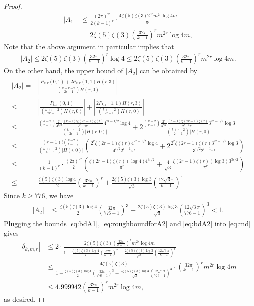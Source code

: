 \documentclass[11pt,letterpaper,reqno]{amsart}
\numberwithin{figure}{section}
\numberwithin{table}{section}
\theoremstyle{definition}
\theoremstyle{plain}
\theoremstyle{definition}
\theoremstyle{definition}
\theoremstyle{remark}
\numberwithin{equation}{section}
\theoremstyle{remark}
\begin{document}
\begin{proof}
\begin{align}
    |A_1|&\leq\frac{(2\pi)^{2r}}{2(k-1)^r}\cdot\frac{4\zeta(5)\zeta(3)2^{3r}m^{2r}\log4m}{\pi^r}\\&=2\zeta(5)\zeta(3)\left(\frac{32\pi}{k-1}\right)^rm^{2r}\log4m,\label{eq:bdA1}
\end{align}
Note that the above argument in particular implies that 
\begin{align}
    |A_{2}|\leq2\zeta(5)\zeta(3)\left(\frac{32\pi}{k-1}\right)^r\log4\leq2\zeta(5)\zeta(3)\left(\frac{32\pi}{k-1}\right)^rm^{2r}\log4m.\label{eq:roughboundforA2}
\end{align}
On the other hand, the upper bound of $|A_2|$ can be obtained by
\begin{align}
    |A_2|=&\left|\frac{P_{k,r}(0,1)+2P_{k,r}(1,1)H(r,3)}{\binom{k+r-2}{2r-1}H(r,0)}\right|\\\leq&\left|\frac{P_{k,r}(0,1)}{\binom{k+r-2}{2r-1}H(r,0)}\right|+\left|\frac{2P_{k,r}(1,1)H(r,3)}{\binom{k+r-2}{2r-1}H(r,0)}\right|\\\leq&\frac{\binom{k-2}{r-1}\frac{2^r}{4^{r/2}}\frac{(r-1)!\zeta(2r-1)\zeta(r)}{2^{r-1}\pi^r}4^{2r-1/2}\log4}{\binom{k+r-2}{2r-1}|H(r,0)|}+2\frac{\binom{k-2}{r-1}\frac{2^r}{3^{r/2}}\frac{(r-1)!\zeta(2r-1)\zeta(r)}{2^{r-1}\pi^r}3^{2r-1/2}\log3}{\binom{k+r-2}{2r-1}|H(r,0)|}\\\leq&\frac{(r-1)!\binom{k-2}{r-1}}{\binom{k+r-2}{2r-1}|H(r,0)|}\left(\frac{2^r\zeta(2r-1)\zeta(r)4^{2r-1/2}\log4}{4^{r/2}2^{r-1}\pi^r}+2\frac{2^r\zeta(2r-1)\zeta(r)3^{2r-1/2}\log3}{3^{r/2}2^{r-1}\pi^r}\right)\\\leq&\frac{1}{(k-1)^{r}}\cdot\frac{(2\pi)^{2r}}{2}\left(\frac{\zeta(2r-1)\zeta(r)(\log4)4^{3r/2}}{\pi^r}+\frac{4}{\sqrt{3}}\frac{\zeta(2r-1)\zeta(r)(\log3)3^{3r/2}}{\pi^r}\right)\\\leq&\frac{\zeta(5)\zeta(3)\log4}{2}\left(\frac{32\pi}{k-1}\right)^r+\frac{2\zeta(5)\zeta(3)\log3}{\sqrt{3}}\left(\frac{12\sqrt{3}\pi}{k-1}\right)^r\label{eq:bdA2}
\end{align}
Since $k\geq776$, we have
\begin{align}
|A_2|&\leq\frac{\zeta(5)\zeta(3)\log4}{2}\left(\frac{32\pi}{776-1}\right)^3+\frac{2\zeta(5)\zeta(3)\log3}{\sqrt{3}}\left(\frac{12\sqrt{3}\pi}{776-1}\right)^3<1.
\end{align}
Plugging the bounds \eqref{eq:bdA1}, \eqref{eq:roughboundforA2} and \eqref{eq:bdA2} into \eqref{eq:md} gives
\begin{align}
|\delta_{k,m,r}|&\leq2\cdot\frac{2\zeta(5)\zeta(3)\left(\frac{32\pi}{k-1}\right)^rm^{2r}\log4m}{1-\frac{\zeta(5)\zeta(3)\log4}{2}\left(\frac{32\pi}{k-1}\right)^r-\frac{2\zeta(5)\zeta(3)\log3}{\sqrt{3}}\left(\frac{12\sqrt{3}\pi}{k-1}\right)^r}\\&\leq \frac{4\zeta(5)\zeta(3)}{1-\frac{\zeta(5)\zeta(3)\log4}{2}\left(\frac{32\pi}{776-1}\right)^3-\frac{2\zeta(5)\zeta(3)\log3}{\sqrt{3}}\left(\frac{12\sqrt{3}\pi}{776-1}\right)^3}\cdot\left(\frac{32\pi}{k-1}\right)^rm^{2r}\log4m\\&\leq4.999942\left(\frac{32\pi}{k-1}\right)^rm^{2r}\log4m,
\end{align}
as desired.
\end{proof}
\end{document}
